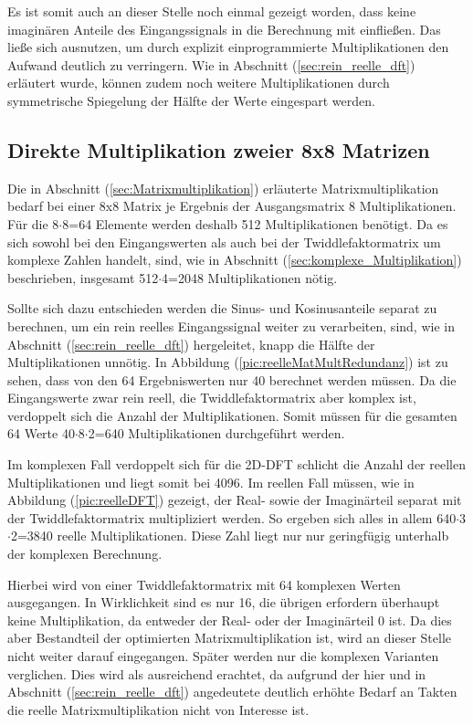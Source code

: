 Es ist somit auch an dieser Stelle noch einmal gezeigt worden, dass keine imaginären Anteile des Eingangssignals in die Berechnung mit einfließen.
Das ließe sich ausnutzen, um durch explizit einprogrammierte Multiplikationen den Aufwand deutlich zu verringern. Wie in Abschnitt (\ref{sec:rein_reelle_dft})
erläutert wurde, können zudem noch weitere Multiplikationen durch symmetrische Spiegelung der Hälfte der Werte eingespart werden.

 
\subsection{Direkte Multiplikation zweier 8x8 Matrizen}
Die in Abschnitt (\ref{sec:Matrixmultiplikation}) erläuterte Matrixmultiplikation bedarf bei einer 8x8 Matrix je Ergebnis der Ausgangsmatrix 8 Multiplikationen. Für
die 8$\cdot$8=64 Elemente werden deshalb 512 Multiplikationen benötigt. Da es sich sowohl bei den Eingangswerten als auch bei der Twiddlefaktormatrix um komplexe
Zahlen handelt, sind, wie in Abschnitt (\ref{sec:komplexe_Multiplikation}) beschrieben, insgesamt 512$\cdot$4=2048 Multiplikationen nötig.

Sollte sich dazu entschieden werden die Sinus- und Kosinusanteile separat zu berechnen, um ein rein reelles Eingangssignal weiter zu verarbeiten, sind, wie in Abschnitt
(\ref{sec:rein_reelle_dft}) hergeleitet, knapp die Hälfte der Multiplikationen unnötig. In Abbildung (\ref{pic:reelleMatMultRedundanz}) ist zu sehen, dass von den 64 
Ergebniswerten nur 40 berechnet werden müssen. Da die Eingangswerte zwar rein reell, die Twiddlefaktormatrix aber komplex ist, verdoppelt sich die Anzahl der Multiplikationen.
Somit müssen für die gesamten 64 Werte 40$\cdot$8$\cdot$2=640 Multiplikationen durchgeführt werden.

Im komplexen Fall verdoppelt sich für die 2D-DFT schlicht die Anzahl der reellen Multiplikationen und liegt somit bei 4096. Im reellen Fall müssen, wie in Abbildung 
(\ref{pic:reelleDFT}) gezeigt, der Real- sowie der Imaginärteil separat mit der Twiddlefaktormatrix multipliziert werden. So ergeben sich alles in allem 
640$\cdot$3$\cdot$2=3840 reelle Multiplikationen. Diese Zahl liegt nur nur geringfügig unterhalb der komplexen Berechnung.



Hierbei wird von einer Twiddlefaktormatrix mit 64 komplexen Werten ausgegangen. In Wirklichkeit sind es nur 16, die übrigen erfordern überhaupt keine Multiplikation, da 
entweder der Real- oder der Imaginärteil 0 ist. Da dies aber Bestandteil der optimierten Matrixmultiplikation ist, wird an dieser Stelle nicht weiter darauf eingegangen.
Später werden nur die komplexen Varianten verglichen. Dies wird als ausreichend erachtet, da aufgrund der hier und in Abschnitt (\ref{sec:rein_reelle_dft}) angedeutete deutlich 
erhöhte Bedarf an Takten die reelle Matrixmultiplikation nicht von Interesse ist. 


